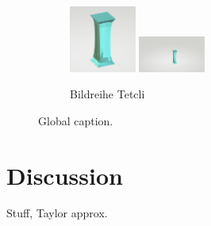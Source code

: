 \begin{figure}[!htbp]
\begin{subfigure}[b]{\textwidth}
        \hfill
        \includegraphics[width=0.24\textwidth]{resources/tetcli_step16.png}
        \hfill
        \includegraphics[width=0.24\textwidth]{resources/tetcli_step24.png}
        \caption{Bildreihe Tetcli}
    \end{subfigure}
    \caption{Global caption.}
    
\end{figure}



\section{Discussion}
Stuff, Taylor approx.


